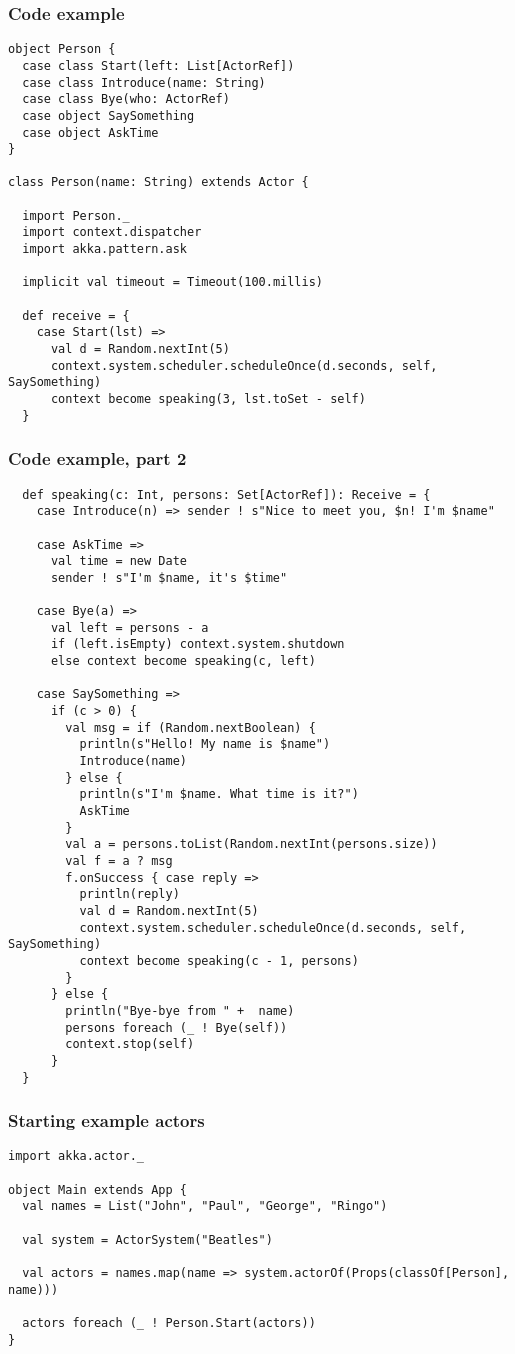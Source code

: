 \documentclass{beamer}
\begin{document}
\begin{frame}[fragile]
\frametitle{Code example}
\begin{lstlisting}[name=person]
object Person {
  case class Start(left: List[ActorRef])
  case class Introduce(name: String)
  case class Bye(who: ActorRef)
  case object SaySomething
  case object AskTime
}

class Person(name: String) extends Actor {

  import Person._
  import context.dispatcher
  import akka.pattern.ask

  implicit val timeout = Timeout(100.millis)

  def receive = {
    case Start(lst) =>
      val d = Random.nextInt(5)
      context.system.scheduler.scheduleOnce(d.seconds, self, SaySomething)
      context become speaking(3, lst.toSet - self)
  }
\end{lstlisting}
\end{frame}

\begin{frame}[fragile]
\frametitle{Code example, part 2}
\begin{lstlisting}
  def speaking(c: Int, persons: Set[ActorRef]): Receive = {
    case Introduce(n) => sender ! s"Nice to meet you, $n! I'm $name"

    case AskTime =>
      val time = new Date
      sender ! s"I'm $name, it's $time"

    case Bye(a) =>
      val left = persons - a
      if (left.isEmpty) context.system.shutdown
      else context become speaking(c, left)

    case SaySomething =>
      if (c > 0) {
        val msg = if (Random.nextBoolean) {
          println(s"Hello! My name is $name")
          Introduce(name)
        } else {
          println(s"I'm $name. What time is it?")
          AskTime
        }
        val a = persons.toList(Random.nextInt(persons.size))
        val f = a ? msg
        f.onSuccess { case reply =>
          println(reply)
          val d = Random.nextInt(5)
          context.system.scheduler.scheduleOnce(d.seconds, self, SaySomething)
          context become speaking(c - 1, persons)
        }
      } else {
        println("Bye-bye from " +  name)
        persons foreach (_ ! Bye(self))
        context.stop(self)
      }
  }
\end{lstlisting}
\end{frame}

\begin{frame}[fragile]
\frametitle{Starting example actors}
\begin{lstlisting}
import akka.actor._

object Main extends App {
  val names = List("John", "Paul", "George", "Ringo")

  val system = ActorSystem("Beatles")

  val actors = names.map(name => system.actorOf(Props(classOf[Person], name)))

  actors foreach (_ ! Person.Start(actors))
}
\end{lstlisting}
\end{frame}
\end{document}
